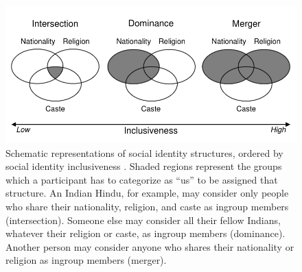 \documentclass[12pt, a4paper]{article}
\begin{document}
\begin{figure}
\centering
\includegraphics[scale=1]{../figures/figure-1}
\caption{
Schematic representations of social identity structures, ordered by social identity inclusiveness \protect\cite{dommelen_construing_2015}. Shaded regions represent the groups which a participant has to categorize as ``us'' to be assigned that structure. An Indian Hindu, for example, may consider only people who share their nationality, religion, and caste as ingroup members (intersection). Someone else may consider all their fellow Indians, whatever their religion or caste, as ingroup members (dominance). Another person may consider anyone who shares their nationality or religion as ingroup members (merger).
}
\label{fig:f1}
\end{figure}

\nolinenumbers



\end{document}
